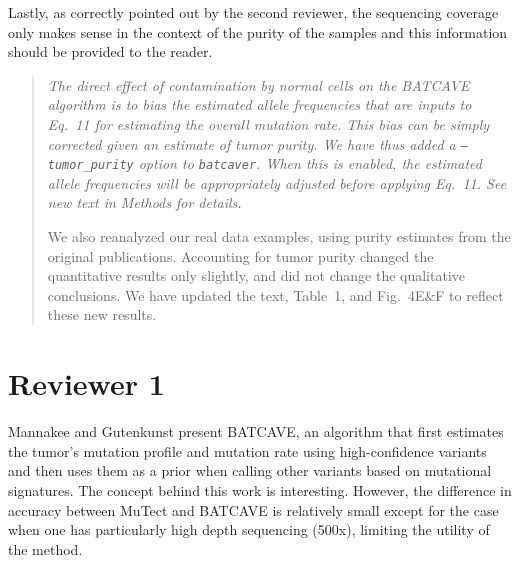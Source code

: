 \documentclass[11pt]{article}
\newenvironment{response}
{\begin{quote}\itshape}
{\end{quote}}
\begin{document}
Lastly, as correctly pointed out by the second reviewer, the sequencing coverage only makes sense in the context of the purity of the samples and this information should be provided to the reader.
\begin{response}
The direct effect of contamination by normal cells on the BATCAVE algorithm is to bias the estimated allele frequencies that are inputs to Eq.~11 for estimating the overall mutation rate.
This bias can be simply corrected given an estimate of tumor purity.
We have thus added a \texttt{--tumor\_purity} option to \texttt{batcaver}.
When this is enabled, the estimated allele frequencies will be appropriately adjusted before applying Eq.~11.
See new text in Methods for details.

We also reanalyzed our real data examples, using purity estimates from the original publications.
Accounting for tumor purity changed the quantitative results only slightly, and did not change the qualitative conclusions.
We have updated the text, Table~1, and Fig.~4E\&F to reflect these new results.
 
\end{response}


\section*{Reviewer 1}

Mannakee and Gutenkunst present BATCAVE, an algorithm that first estimates the tumor’s mutation profile and mutation rate using high-confidence variants and then uses them as a prior when calling other variants based on mutational signatures. The concept behind this work is interesting. However, the difference in accuracy between MuTect and BATCAVE is relatively small except for the case when one has particularly high depth sequencing (500x), limiting the utility of the method. 
\end{document}
